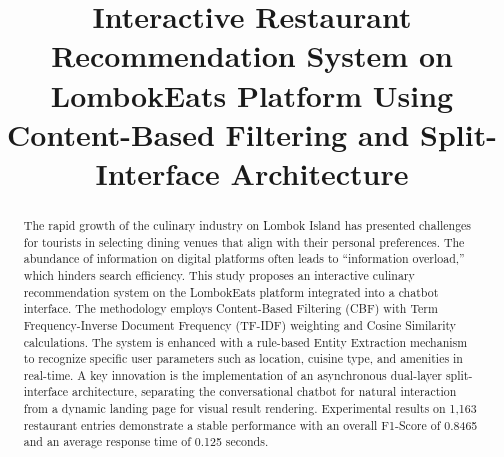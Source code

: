 \documentclass[conference]{IEEEtran}
\begin{document}
\title{Interactive Restaurant Recommendation System on LombokEats Platform Using Content-Based Filtering and Split-Interface Architecture}

\author{
\and
{}
\and
{}
\and
{}
}

\maketitle

\begin{abstract}
The rapid growth of the culinary industry on Lombok Island has presented challenges for tourists in selecting dining venues that align with their personal preferences\cite{b10}. The abundance of information on digital platforms often leads to ``information overload,'' which hinders search efficiency\cite{b1}. This study proposes an interactive culinary recommendation system on the LombokEats platform integrated into a chatbot interface. The methodology employs Content-Based Filtering (CBF) with Term Frequency-Inverse Document Frequency (TF-IDF) weighting and Cosine Similarity calculations\cite{b6}. The system is enhanced with a rule-based Entity Extraction mechanism to recognize specific user parameters such as location, cuisine type, and amenities in real-time\cite{b7}. A key innovation is the implementation of an asynchronous dual-layer split-interface architecture, separating the conversational chatbot for natural interaction from a dynamic landing page for visual result rendering\cite{b13}. Experimental results on 1,163 restaurant entries demonstrate a stable performance with an overall F1-Score of 0.8465 and an average response time of 0.125 seconds\cite{b14}.
\end{abstract}
\end{document}
